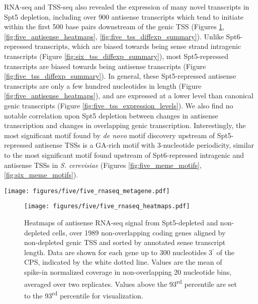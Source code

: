 RNA-seq and TSS-seq also revealed the expression of many novel transcripts in Spt5 depletion, including over 900 antisense transcripts which tend to initiate within the first 500 base pairs downstream of the genic TSS (Figures \ref{fig:five_rnaseq_heatmaps}, \ref{fig:five_antisense_heatmaps}, \ref{fig:five_tss_diffexp_summary}).
Unlike Spt6-repressed transcripts, which are biased towards being sense strand intragenic transcripts (Figure \ref{fig:six_tss_diffexp_summary}), most Spt5-repressed transcripts are biased towards being antisense transcripts (Figure \ref{fig:five_tss_diffexp_summary}).
In general, these Spt5-repressed antisense transcripts are only a few hundred nucleotides in length (Figure \ref{fig:five_antisense_heatmaps}), and are expressed at a lower level than canonical genic transcripts (Figure \ref{fig:five_tss_expression_levels}).
We also find no notable correlation upon Spt5 depletion between changes in antisense transcription and changes in overlapping genic transcription.
Interestingly, the most significant motif found by \textit{de novo} motif discovery upstream of Spt5-repressed antisense TSSs is a GA-rich motif with 3-nucleotide periodicity, similar to the most significant motif found upstream of Spt6-repressed intragenic and antisense TSSs in \textit{S. cerevisiae} (Figures \ref{fig:five_meme_motifs}, \ref{fig:six_meme_motifs}).

\begin{SCfigure}[50][h]
    \texttt{[image: figures/five/five\_rnaseq\_metagene.pdf]}
    \caption[Average sense RNA-seq signal over non-overlapping coding genes, from Spt5-depleted and non-depleted cells.]{Average sense RNA-seq signal in Spt5 non-depleted and depleted cells, over 1989 non-overlapping coding genes scaled from TSS to CPS. The solid line and shading are the median and inter-quartile range of the mean spike-in normalized coverage over two replicates, taken in non-overlapping 20 nt bins and standardized per gene.}
    \label{fig:five_rnaseq_metagene}
\end{SCfigure}

\begin{figure}[h]
    \centering
    \texttt{[image: figures/five/five\_rnaseq\_heatmaps.pdf]}
    \caption[Heatmaps of antisense RNA-seq signal from Spt5-depleted and non-depleted cells, over non-overlapping coding genes.]{Heatmaps of antisense RNA-seq signal from Spt5-depleted and non-depleted cells, over 1989 non-overlapping coding genes aligned by non-depleted genic TSS and sorted by annotated sense transcript length. Data are shown for each gene up to 300 nucleotides 3$^\prime$ of the CPS, indicated by the white dotted line. Values are the mean of spike-in normalized coverage in non-overlapping 20 nucleotide bins, averaged over two replicates. Values above the 93\textsuperscript{rd} percentile are set to the 93\textsuperscript{rd} percentile for visualization.}
    \label{fig:five_rnaseq_heatmaps}
\end{figure}

